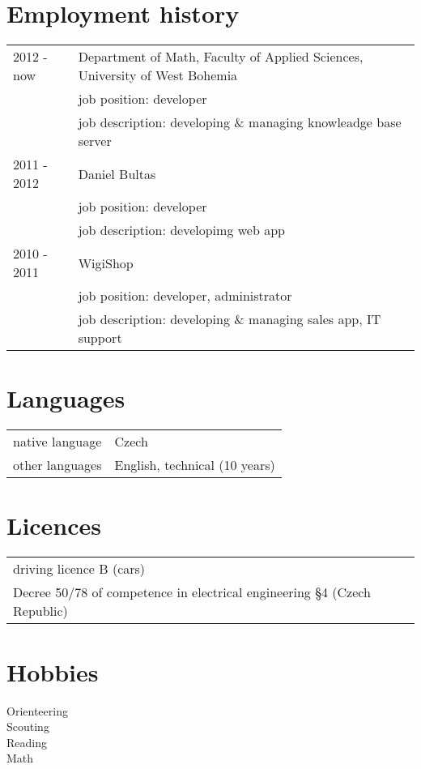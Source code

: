 \documentclass[12pt,a4paper]{article}
\begin{document}
\section*{Employment history}
\begin{tabular}{@{}p{2cm}l}
2012 - now & Department of Math, Faculty of Applied Sciences, University of West Bohemia \\
 & job position: developer\\
 & job description: developing \& managing knowleadge base server\\
2011 - 2012 & Daniel Bultas\\
 & job position: developer\\
 & job description: developimg web app\\
2010 - 2011 & WigiShop\\
 & job position: developer, administrator\\
 & job description: developing \& managing sales app, IT support\\
\end{tabular}

\section*{Languages}
\begin{tabular}{@{}p{4cm}l}
native language & Czech\\
other languages & English, technical (10 years)\\
\end{tabular}

\section*{Licences}
\begin{tabular}{@{}l}
driving licence  B (cars)\\
Decree 50/78 of competence in electrical engineering §4 (Czech Republic)\\
\end{tabular}

\section*{Hobbies}
Orienteering\\
Scouting\\
Reading\\
Math\\
\end{document}
